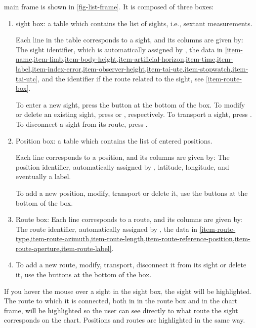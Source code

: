 \documentclass{ol-softwaremanual}
\begin{document}
\thel main frame is shown in \cref{fig-list-frame}. It is composed of three boxes: 
\begin{enumerate}
  \item \label{item-sight-box} \Gls{sight} box: a table which contains the list of sights, i.e., sextant measurements. 
  
  Each line in the table corresponds to a \gls{sight}, and its columns are given by: The \gls{sight} identifier, which is automatically assigned by \thel,  the data in \cref{item-name,item-limb,item-body-height,item-artificial-horizon,item-time,item-label,item-index-error,item-observer-height,item-tai-utc,item-stopwatch,item-tai-utc}, and the identifier if the route related to the \gls{sight}, see \cref{item-route-box}. 

  To enter a new \gls{sight}, press the  button at the bottom of the box. To modify or delete an existing \gls{sight}, press   or  , respectively. To transport a \gls{sight}, press . 
   To disconnect a \gls{sight} from its route, press  . 

  \item \label{item-position-box} Position box: a table which contains the list of entered positions. 
  
  Each line corresponds to a position, and its columns are given by: The position identifier, automatically assigned by \thel,  latitude, longitude, and eventually a label. 

To add a new position, modify, transport or delete it, use the buttons at the bottom of the box. 

  \item \label{item-route-box} Route box: Each line corresponds to a route, and its columns are given by: The route identifier, automatically assigned by \thel, the data in \cref{item-route-type,item-route-azimuth,item-route-length,item-route-reference-position,item-route-aperture,item-route-label}. 
  \item 
  To add a new route, modify, transport, disconnect it from its \gls{sight} or delete it, use the buttons at the bottom of the box. 

\end{enumerate}



If you hover the mouse over a \gls{sight} in the \gls{sight} box, the \gls{sight} will be highlighted. The route to which it is connected, both in in the route box and in the chart frame, will be highlighted so the user can see directly to what route the \gls{sight} corresponds on the chart. Positions and routes are highlighted in the same way. 
\end{document}
